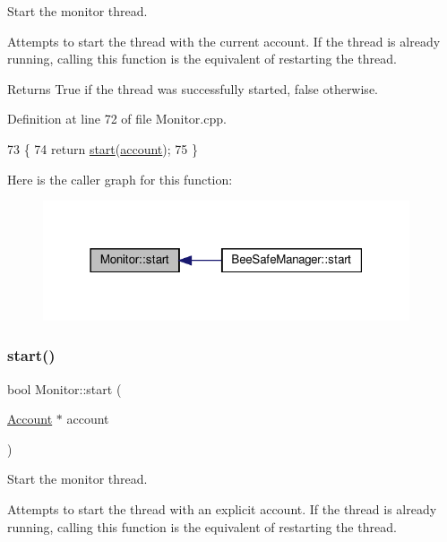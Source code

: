 Start the monitor thread.

Attempts to start the thread with the current account. If the thread is already running, calling this function is the equivalent of restarting the thread.

\begin{DoxyReturn}{Returns}
True if the thread was successfully started, false otherwise. 
\end{DoxyReturn}


Definition at line 72 of file Monitor.\+cpp.


\begin{DoxyCode}
73 \{
74     \textcolor{keywordflow}{return} \hyperlink{class_monitor_a71dfa92dfa25ee137f4e3d5e01a8d673}{start}(\hyperlink{class_monitor_acacff99178fbcd9eae50801acc346bf4}{account});
75 \}
\end{DoxyCode}
Here is the caller graph for this function\+:\nopagebreak
\begin{figure}[H]
\begin{center}
\leavevmode
\includegraphics[width=307pt]{d9/df7/class_monitor_a71dfa92dfa25ee137f4e3d5e01a8d673_icgraph}
\end{center}
\end{figure}
\mbox{\label{class_monitor_a5a01b1c1084f0826a01c184519491cf6}} 
\subsubsection{\texorpdfstring{start()}{start()}\hspace{0.1cm}{\footnotesize\ttfamily [2/2]}}
{\footnotesize\ttfamily bool Monitor\+::start (\begin{DoxyParamCaption}\item[{\hyperlink{class_account}{Account} $\ast$}]{account }\end{DoxyParamCaption})}

Start the monitor thread.

Attempts to start the thread with an explicit account. If the thread is already running, calling this function is the equivalent of restarting the thread.


